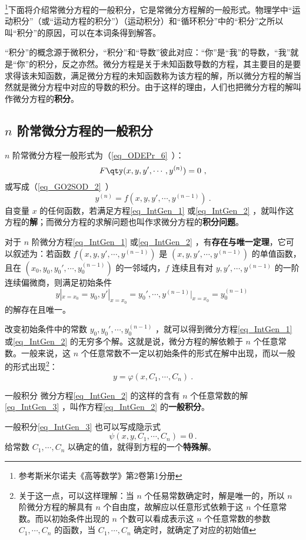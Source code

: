 \footnote{参考斯米尔诺夫《高等数学》第2卷第1分册}下面将介绍常微分方程的一般积分，它是常微分方程解的一般形式。物理学中“运动积分”（或“运动方程的积分”）（运动积分）和“循环积分”中的“积分”之所以叫“积分”的原因，可以在本词条得到解答。

“积分”的概念源于微积分，“积分”和“导数”彼此对应：“你”是“我”的导数，“我”就是“你”的积分，反之亦然。微分方程是关于未知函数导数的方程，其主要目的是要求得该未知函数，满足微分方程的未知函数称为该方程的解，所以微分方程的解当然就是微分方程中对应的导数的积分。由于这样的理由，人们也把微分方程的解叫作微分方程的\textbf{积分}。
\subsection{$n$ 阶常微分方程的一般积分}
$n$ 阶常微分方程一般形式为（\autoref{eq_ODEPr_6}~）：
\begin{equation}\label{eq_IntGen_1}
F \qty(x,y,y',\cdots,y^{(n)}) =0~,
\end{equation}
或写成（\autoref{eq_GO2SOD_2}~）
\begin{equation}\label{eq_IntGen_2}
y^{(n)}=f(x,y,y',\cdots,y^{(n-1)})~.
\end{equation}
自变量 $x$ 的任何函数，若满足方程\autoref{eq_IntGen_1} 或\autoref{eq_IntGen_2} ，就叫作这方程的\textbf{解}；而微分方程的求解问题也叫作求微分方程的\textbf{积分问题}。

对于 $n$ 阶微分方程\autoref{eq_IntGen_1} 或\autoref{eq_IntGen_2} ，有\textbf{存在与唯一定理}，它可以叙述为：若函数 $f(x,y,y',\cdots,y^{(n-1)})$ 是 $(x,y,y',\cdots,y^{(n-1)})$ 的单值函数，且在 $(x_0,y_0,y_0',\cdots,y_0^{(n-1)})$ 的一邻域内，$f$ 连续且有对 $y,y',\cdots,y^{(n-1)}$ 的一阶连续偏微商，则满足初始条件
\begin{equation}\label{eq_IntGen_5}
y|_{x=x_0}=y_0,y'|_{x=x_0}=y_0',\cdots,y^{(n-1)}|_{x=x_0}=y_0^{(n-1)}~
\end{equation}
的解存在且唯一。

改变初始条件中的常数 $y_0,y_0',\cdots,y_0^{(n-1)}$ ，就可以得到微分方程\autoref{eq_IntGen_1} 或\autoref{eq_IntGen_2} 的无穷多个解。这就是说，微分方程的解依赖于 $n$ 个任意常数。一般来说，这 $n$ 个任意常数不一定以初始条件的形式在解中出现，而以一般的形式出现\footnote{关于这一点，可以这样理解：当 $n$ 个任易常数确定时，解是唯一的，所以 $n$ 阶微分方程的解具有 $n$ 个自由度，故解应以任意形式依赖于这 $n$ 个任意常数。而以初始条件出现的 $n$ 个数可以看成表示这 $n$ 个任意常数的参数 $C_1,\cdots,C_n$ 的函数，当 $C_1,\cdots,C_n$ 确定时，就确定了对应的初始值}：
\begin{equation}\label{eq_IntGen_3}
y=\varphi(x,C_1,\cdots,C_n)~.
\end{equation}
\begin{definition}{一般积分}
微分方程\autoref{eq_IntGen_2} 的这样的含有 $n$ 个任意常数的解\autoref{eq_IntGen_3} ，叫作方程\autoref{eq_IntGen_2} 的\textbf{一般积分}。
\end{definition}
一般积分\autoref{eq_IntGen_3} 也可以写成隐示式
\begin{equation}\label{eq_IntGen_4}
\psi(x,y,C_1,\cdots,C_n)=0~.
\end{equation}
给常数 $C_1,\cdots,C_n$ 以确定的值，就得到方程的一个\textbf{特殊解}。

